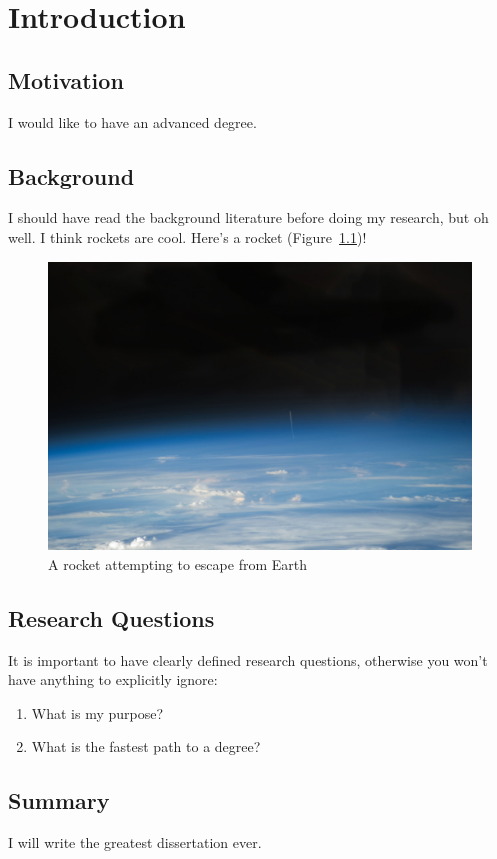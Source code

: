 \chapter{Introduction}

\section{Motivation}
I would like to have an advanced degree.

\section{Background}
I should have read the background literature before doing my research, but oh well.
I think rockets are cool.
Here's a rocket (Figure~\ref{figure:bigolrocket})!

\begin{figure}[tb]
    \begin{center}
        \includegraphics[width=0.33\linewidth]{figures/Introduction/ArianeLaunchFromISS.jpg}
        \caption[Rocket go vroom]{A rocket attempting to escape from Earth}
        \label{figure:bigolrocket}
    \end{center}
\end{figure}

\section{Research Questions}
It is important to have clearly defined research questions, otherwise you won't have anything to explicitly ignore:
\begin{enumerate}
    \item What is my purpose?
    \item What is the fastest path to a degree?
\end{enumerate}

\section{Summary}
I will write the greatest dissertation ever.
